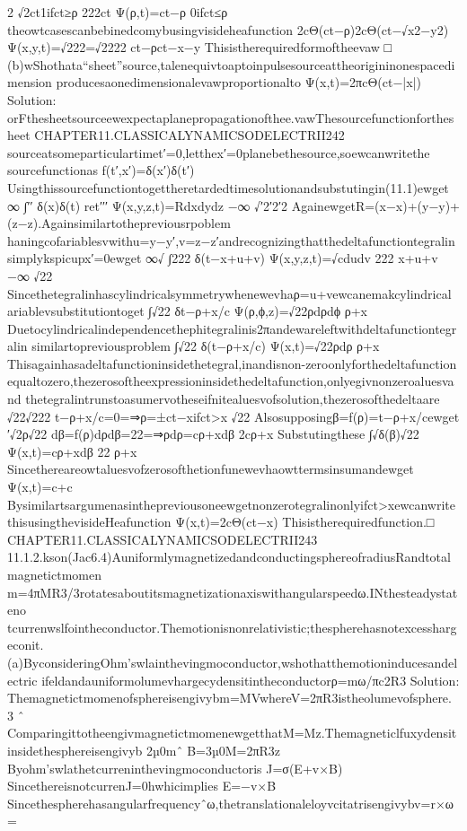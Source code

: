 {{{{{{{{{{{{{{{{2
√2ct1ifct≥ρ
222ct
Ψ(ρ,t)=ct−ρ
0ifct≤ρ
theowtcasescanbebinedcomybusingvisideheafunction
2cΘ(ct−ρ)2cΘ(ct−√x2−y2)
Ψ(x,y,t)=√222=√2222
ct−ρct−x−y
Thisistherequiredformoftheevaw
□
(b)wShothata“sheet”source,talenequivtoaptoinpulsesourceattheorigininonespacedimension
producesaonedimensionalevawproportionalto
Ψ(x,t)=2πcΘ(ct−|x|)
Solution:
orFthesheetsourceewexpectaplanepropagationofthee.vawThesourcefunctionforthesheet
CHAPTER11.CLASSICALYNAMICSODELECTRII242
sourceatsomeparticulartimet′=0,letthex′=0planebethesource,soewcanwritethe
sourcefunctionas
f(t′,x′)=δ(x′)δ(t′)
Usingthissourcefunctiontogettheretardedtimesolutionandsubstutingin(11.1)ewget
∞
∫′′
δ(x)δ(t)
ret′′′
Ψ(x,y,z,t)=Rdxdydz
−∞
√′2′2′2
AgainewgetR=(x−x)+(y−y)+(z−z).Againsimilartothepreviousrpoblem
haningcofariablesvwithu=y−y′,v=z−z′andrecognizingthatthedeltafunctiontegralin
simplykspicupx′=0ewget
∞√
∫222
δ(t−x+u+v)
Ψ(x,y,z,t)=√cdudv
222
x+u+v
−∞
√22
Sincethetegralinhascylindricalsymmetrywhenewevhaρ=u+vewcanemakcylindrical
ariablevsubstitutiontoget
∫√22
δt−ρ+x/c
Ψ(ρ,ϕ,z)=√22ρdρdϕ
ρ+x
Duetocylindricalindependencethephitegralinis2πandewareleftwithdeltafunctiontegralin
similartopreviousproblem
∫√22
δ(t−ρ+x/c)
Ψ(x,t)=√22ρdρ
ρ+x
Thisagainhasadeltafunctioninsidethetegral,inandisnon-zeroonlyforthedeltafunction
equaltozero,thezerosoftheexpressioninsidethedeltafunction,onlyegivnonzeroaluesvand
thetegralintrunstoasumervotheseifnitealuesvofsolution,thezerosofthedeltaare
√22√222
t−ρ+x/c=0=⇒ρ=±ct−xifct>x
√22
Alsosupposingβ=f(ρ)=t−ρ+x/cewget
′√2ρ√22
dβ=f(ρ)dρdβ=22=⇒ρdρ=cρ+xdβ
2cρ+x
Substutingthese
∫√δ(β)√22
Ψ(x,t)=cρ+xdβ
22
ρ+x
Sincethereareowtaluesvofzerosofthetionfunewevhaowttermsinsumandewget
Ψ(x,t)=c+c
Bysimilartsargumenasinthepreviousoneewgetnonzerotegralinonlyifct>xewcanwrite
thisusingthevisideHeafunction
Ψ(x,t)=2cΘ(ct−x)
Thisistherequiredfunction.□
CHAPTER11.CLASSICALYNAMICSODELECTRII243
11.1.2.kson(Jac6.4)AuniformlymagnetizedandconductingsphereofradiusRandtotalmagnetictmomen
m=4πMR3/3rotatesaboutitsmagnetizationaxiswithangularspeedω.INthesteadystateno
tcurrenwslfointheconductor.Themotionisnonrelativistic;thespherehasnotexcesshargeconit.
(a)ByconsideringOhm’swlainthevingmoconductor,wshothatthemotioninducesandelectric
ifeldandauniformolumevhargecydensitintheconductorρ=mω/πc2R3
Solution:
Themagnetictmomenofsphereisengivybm=MVwhereV=2πR3istheolumevofsphere.
3
ˆ
ComparingittotheengivmagnetictmomenewgetthatM=Mz.Themagneticlfuxydensit
insidethesphereisengivyb
2µ0mˆ
B=3µ0M=2πR3z
Byohm’swlathetcurreninthevingmoconductoris
J=σ(E+v×B)
SincethereisnotcurrenJ=0hwhicimplies
E=−v×B
Sincethespherehasangularfrequencyˆω,thetranslationaleloyvcitatrisengivybv=r×ω=
}}}}}}}}}}}}}}}}
